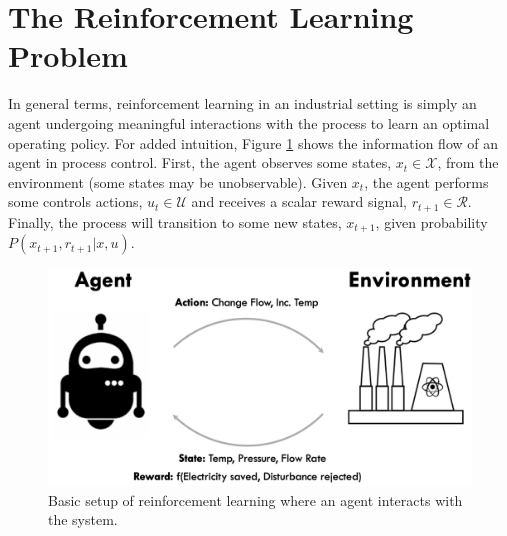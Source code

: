 %
%

\section{The Reinforcement Learning Problem}

In general terms, reinforcement learning in an industrial setting is simply an agent undergoing meaningful interactions with the process to learn an optimal operating policy.  For added intuition, Figure \ref{fig: simple_rl} shows the information flow of an agent in process control. First, the agent observes some states, $x_t \in \mathcal{X}$, from the environment (some states may be unobservable).  Given $x_t$, the agent performs some controls actions, $u_t \in \mathcal{U}$ and receives a scalar reward signal, $r_{t+1} \in \mathcal{R}$.  Finally, the process will transition to some new states, $x_{t+1}$, given probability $P(x_{t+1}, r_{t+1} | x, u)$.

\begin{figure}[H]
    \centering
    \includegraphics[scale=0.5]{images/ch1/RL.png}
    \caption{Basic setup of reinforcement learning where an agent interacts with the system.}
    \label{fig: simple_rl}
\end{figure}

